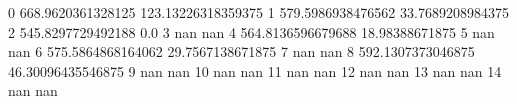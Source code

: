 0 668.9620361328125 123.13226318359375
1 579.5986938476562 33.7689208984375
2 545.8297729492188 0.0
3 nan nan
4 564.8136596679688 18.98388671875
5 nan nan
6 575.5864868164062 29.7567138671875
7 nan nan
8 592.1307373046875 46.30096435546875
9 nan nan
10 nan nan
11 nan nan
12 nan nan
13 nan nan
14 nan nan
